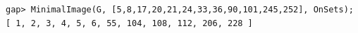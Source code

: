 \begin{verbatim}
gap> MinimalImage(G, [5,8,17,20,21,24,33,36,90,101,245,252], OnSets);
[ 1, 2, 3, 4, 5, 6, 55, 104, 108, 112, 206, 228 ]
\end{verbatim}
